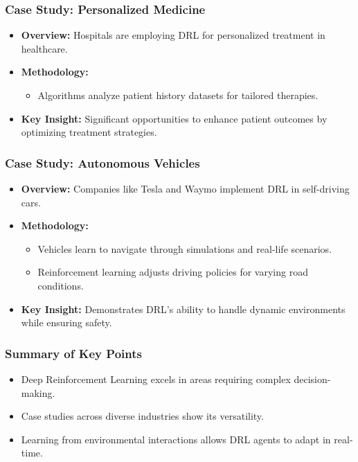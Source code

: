 \documentclass[aspectratio=169]{beamer}
\begin{document}
\begin{frame}[fragile]
    \frametitle{Case Study: Personalized Medicine}
    \begin{itemize}
        \item \textbf{Overview:} Hospitals are employing DRL for personalized treatment in healthcare.
        \item \textbf{Methodology:}
            \begin{itemize}
                \item Algorithms analyze patient history datasets for tailored therapies.
            \end{itemize}
        \item \textbf{Key Insight:} 
            Significant opportunities to enhance patient outcomes by optimizing treatment strategies.
    \end{itemize}
\end{frame}

\begin{frame}[fragile]
    \frametitle{Case Study: Autonomous Vehicles}
    \begin{itemize}
        \item \textbf{Overview:} Companies like Tesla and Waymo implement DRL in self-driving cars.
        \item \textbf{Methodology:}
            \begin{itemize}
                \item Vehicles learn to navigate through simulations and real-life scenarios.
                \item Reinforcement learning adjusts driving policies for varying road conditions.
            \end{itemize}
        \item \textbf{Key Insight:} 
            Demonstrates DRL’s ability to handle dynamic environments while ensuring safety.
    \end{itemize}
\end{frame}

\begin{frame}[fragile]
    \frametitle{Summary of Key Points}
    \begin{itemize}
        \item Deep Reinforcement Learning excels in areas requiring complex decision-making.
        \item Case studies across diverse industries show its versatility.
        \item Learning from environmental interactions allows DRL agents to adapt in real-time.
    \end{itemize}
\end{frame}
\end{document}

